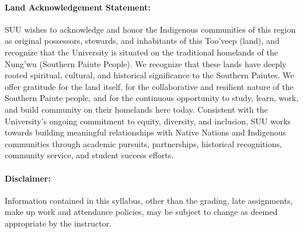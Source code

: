 \documentclass[12pt, letterpaper]{article}
\begin{document}
\paragraph{Land Acknowledgement Statement:}
SUU wishes to acknowledge and honor the Indigenous communities of this region as original possessors, stewards, and inhabitants of this Too’veep (land), and recognize that the University is situated on the traditional homelands of the Nung’wu (Southern Paiute People). We recognize that these lands have deeply rooted spiritual, cultural, and historical significance to the Southern Paiutes. We offer gratitude for the land itself, for the collaborative and resilient nature of the Southern Paiute people, and for the continuous opportunity to study, learn, work, and build community on their homelands here today. Consistent with the University's ongoing commitment to equity, diversity, and inclusion, SUU works towards building meaningful relationships with Native Nations and Indigenous communities through academic pursuits, partnerships, historical recognitions, community service, and student success efforts.

\paragraph{Disclaimer:}
Information contained in this syllabus, other than the grading, late assignments, make up work and attendance policies, may be subject to change as deemed appropriate by the instructor.
\end{document}
